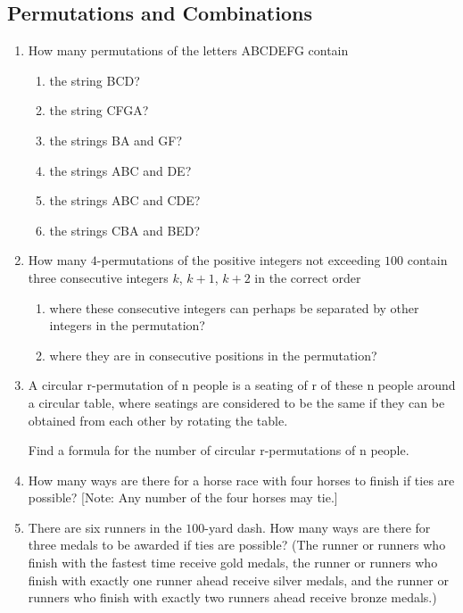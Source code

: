 \documentclass{../../cls/sig-alternate-05-2015}
\begin{document}
\subsection{Permutations and Combinations}
\begin{enumerate}

	\item How many permutations of the letters ABCDEFG contain
	\begin{enumerate}
		\item the string BCD?
		\item the string CFGA?
		\item the strings BA and GF?
		\item the strings ABC and DE?
		\item the strings ABC and CDE?
		\item the strings CBA and BED?
	\end{enumerate}
	
	\item How many $4$-permutations of the positive integers not exceeding
	$100$ contain three consecutive integers $k$, $k + 1$,
	$k + 2$ in the correct order
	\begin{enumerate}
		\item where these consecutive integers can perhaps be separated
		by other integers in the permutation?
		\item  where they are in consecutive positions in the permutation?
	\end{enumerate}
	
	\item A circular r-permutation of n people is a seating of r of
	these n people around a circular table, where seatings are considered
	to be the same if they can be obtained from each other
	by rotating the table.
	
	Find a formula for the number of circular r-permutations
	of n people.
	
	\item How many ways are there for a horse race with four horses
	to finish if ties are possible? [Note: Any number of the
	four horses may tie.]
	
	\item There are six runners in the $100$-yard dash. How many
	ways are there for three medals to be awarded if ties
	are possible? (The runner or runners who finish with the
	fastest time receive gold medals, the runner or runners
	who finish with exactly one runner ahead receive silver
	 medals, and the runner or runners who finish with exactly
	two runners ahead receive bronze medals.)

\end{enumerate}
\end{document}
